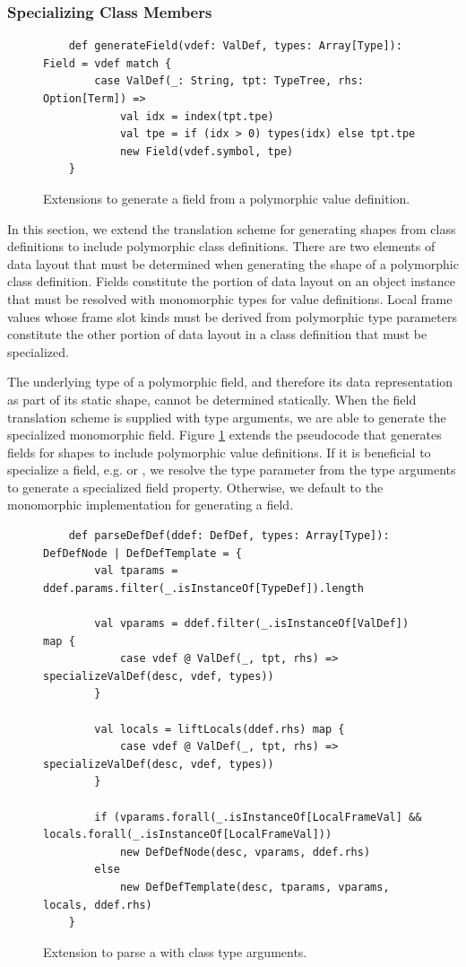 \subsubsection*{Specializing Class Members}

\begin{figure}[!htb]
	\begin{verbatim}
	def generateField(vdef: ValDef, types: Array[Type]): Field = vdef match {
		case ValDef(_: String, tpt: TypeTree, rhs: Option[Term]) => 
			val idx = index(tpt.tpe)
			val tpe = if (idx > 0) types(idx) else tpt.tpe
			new Field(vdef.symbol, tpe)
	}
	\end{verbatim}
	\caption{Extensions to generate a field from a polymorphic value definition.}
	\label{impl:generate-poly-field}
\end{figure}

In this section, we extend the translation scheme for generating shapes from class definitions to include polymorphic class definitions.
There are two elements of data layout that must be determined when generating the shape of a polymorphic class definition.
Fields constitute the portion of data layout on an object instance that must be resolved with monomorphic types for value definitions.
Local frame values whose frame slot kinds must be derived from polymorphic type parameters constitute the other portion of data layout in a class definition that must be specialized.

The underlying type of a polymorphic field, and therefore its data representation as part of its static shape, cannot be determined statically.
When the field translation scheme is supplied with type arguments, we are able to generate the specialized monomorphic field.
Figure \ref{impl:generate-poly-field} extends the pseudocode that generates fields for shapes to include polymorphic value definitions.
If it is beneficial to specialize a field, e.g.  or , we resolve the type parameter from the type arguments to generate a specialized field property.
Otherwise, we default to the monomorphic implementation for generating a field.

\begin{figure}[!htb]
	\begin{verbatim}
	def parseDefDef(ddef: DefDef, types: Array[Type]): DefDefNode | DefDefTemplate = {
		val tparams = ddef.params.filter(_.isInstanceOf[TypeDef]).length
		
		val vparams = ddef.filter(_.isInstanceOf[ValDef]) map {
			case vdef @ ValDef(_, tpt, rhs) => specializeValDef(desc, vdef, types))
		}
	
		val locals = liftLocals(ddef.rhs) map {
			case vdef @ ValDef(_, tpt, rhs) => specializeValDef(desc, vdef, types))
		}
	
		if (vparams.forall(_.isInstanceOf[LocalFrameVal] && locals.forall(_.isInstanceOf[LocalFrameVal]))
			new DefDefNode(desc, vparams, ddef.rhs)
		else 
			new DefDefTemplate(desc, tparams, vparams, locals, ddef.rhs)
	}
	\end{verbatim}
	\caption{Extension to parse a  with class type arguments.}
	\label{impl:parse-poly-defdef-cls}
\end{figure}

